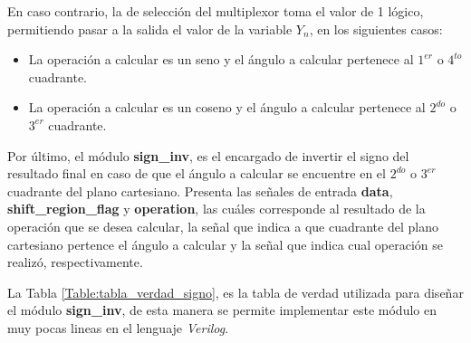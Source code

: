 En caso contrario, la de selección del multiplexor toma el valor de 1 lógico, permitiendo pasar a la salida el valor de la variable $Y_{n}$, en los siguientes casos:
\begin{itemize}
\item	La operación a calcular es un seno y el ángulo a calcular pertenece al $1^{er}$ o $4^{to}$ cuadrante.
\item	La operación a calcular es un coseno y el ángulo a calcular pertenece al $2^{do}$ o $3^{er}$ cuadrante.
\end{itemize}

Por último, el módulo \textbf{sign\_inv}, es el encargado de invertir el signo del resultado final en caso de que el ángulo a calcular se encuentre en el $2^{do}$ o $3^{er}$ cuadrante del plano cartesiano. Presenta las señales de entrada \textbf{data}, \textbf{shift\_region\_flag} y \textbf{operation}, las cuáles corresponde al resultado de la operación que se desea calcular, la señal que indica a que cuadrante del plano cartesiano pertence el ángulo a calcular y la señal que indica cual operación se realizó, respectivamente. 

La Tabla \ref{Table:tabla_verdad_signo}, es la tabla de verdad utilizada para diseñar el módulo \textbf{sign\_inv}, de esta manera se permite implementar este módulo en muy pocas lineas en el lenguaje \textit{Verilog}.

